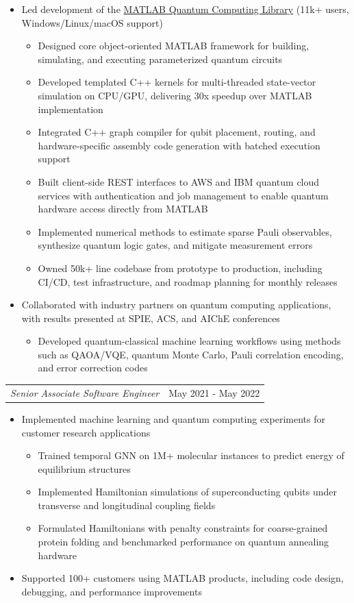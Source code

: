 \documentclass[11pt,a4paper,sans]{moderncv}
\makeatletter
\newcommand{\role}[2]{%
  \par\noindent\begin{tabular*}{\textwidth}{@{}l@{\extracolsep{\fill}}r@{}}%
    \textit{#1} & #2
  \end{tabular*}\par
}
\makeatother
\begin{document}
\begin{itemize}
\item Led development of the {\color{blue}\href{https://www.mathworks.com/help/matlab/quantum-computing.html?s_tid=CRUX_lftnav}{MATLAB Quantum Computing Library}} (11k+ users, Windows/Linux/macOS support) %
\begin{itemize}
\item Designed core object-oriented MATLAB framework for building, simulating, and executing parameterized quantum circuits
\item Developed templated C++ kernels for multi-threaded state-vector simulation on CPU/GPU, delivering 30x speedup over MATLAB implementation
\item Integrated C++ graph compiler for qubit placement, routing, and hardware-specific assembly code generation with batched execution support
\item Built client-side REST interfaces to AWS and IBM quantum cloud services with authentication and job management to enable quantum hardware access directly from MATLAB
\item Implemented numerical methods to estimate sparse Pauli observables, synthesize quantum logic gates, and mitigate measurement errors
\item Owned 50k+ line codebase from prototype to production, including CI/CD, test infrastructure, and roadmap planning for monthly releases
\end{itemize}
\item Collaborated with industry partners on quantum computing applications, with results presented at SPIE, ACS, and AIChE conferences
\begin{itemize}
\item Developed quantum-classical machine learning workflows using methods such as QAOA/VQE, quantum Monte Carlo, Pauli correlation encoding, and error correction codes
\end{itemize}
\end{itemize}

\role{Senior Associate Software Engineer}{May 2021 - May 2022}

\begin{itemize}
\item Implemented machine learning and quantum computing experiments for customer research applications
\begin{itemize}
  \item Trained temporal GNN on 1M+ molecular instances to predict energy of equilibrium structures
  \item Implemented Hamiltonian simulations of superconducting qubits under transverse and longitudinal coupling fields
  \item Formulated Hamiltonians with penalty constraints for coarse-grained protein folding and benchmarked performance on quantum annealing hardware
\end{itemize}
\item Supported 100+ customers using MATLAB products, including code design, debugging, and performance improvements
\end{itemize}
\end{document}

